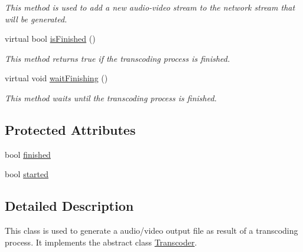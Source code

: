\begin{DoxyCompactItemize}
\begin{DoxyCompactList}\small\item\em This method is used to add a new audio-\/video stream to the network stream that will be generated. \item\end{DoxyCompactList}\item 
virtual bool \hyperlink{classbr_1_1ufscar_1_1lince_1_1xpta_1_1streaming_1_1AVOutputFile_ad25c8530fc11ca328e5390fb70c4da08}{isFinished} ()
\begin{DoxyCompactList}\small\item\em This method returns true if the transcoding process is finished. \item\end{DoxyCompactList}\item 
virtual void \hyperlink{classbr_1_1ufscar_1_1lince_1_1xpta_1_1streaming_1_1AVOutputFile_a488643d156229813598cc413cc63a920}{waitFinishing} ()
\begin{DoxyCompactList}\small\item\em This method waits until the transcoding process is finished. \item\end{DoxyCompactList}\end{DoxyCompactItemize}
\subsection*{Protected Attributes}
\begin{DoxyCompactItemize}
\item 
bool \hyperlink{classbr_1_1ufscar_1_1lince_1_1xpta_1_1streaming_1_1AVOutputFile_a518fd941f5d441f01be59e506e203d34}{finished}
\item 
bool \hyperlink{classbr_1_1ufscar_1_1lince_1_1xpta_1_1streaming_1_1AVOutputFile_aab4b600fb20a80bb2045729a2423027f}{started}
\end{DoxyCompactItemize}


\subsection{Detailed Description}
This class is used to generate a audio/video output file as result of a transcoding process. It implements the abstract class \hyperlink{classbr_1_1ufscar_1_1lince_1_1xpta_1_1streaming_1_1Transcoder}{Transcoder}. 

